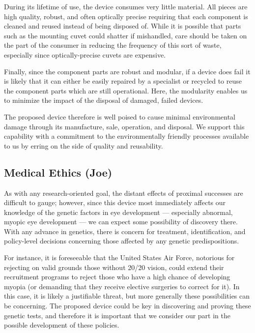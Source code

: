 \documentclass{article}
\begin{document}
During its lifetime of use, the device consumes very little
material. All pieces are high quality, robust, and often optically
precise requiring that each component is cleaned and reused instead of
being disposed of. While it is possible that parts such as the
mounting cuvet could shatter if mishandled, care should be taken on
the part of the consumer in reducing the frequency of this sort of
waste, especially since optically-precise cuvets are expensive.

Finally, since the component parts are robust and modular, if a device
does fail it is likely that it can either be easily repaired by a
specialist or recycled to reuse the component parts which are still
operational. Here, the modularity enables us to minimize the impact of
the disposal of damaged, failed devices.

The proposed device therefore is well poised to cause minimal
environmental damage through its manufacture, sale, operation, and
disposal. We support this capability with a commitment to the
environmentally friendly processes available to us by erring on the
side of quality and reusability.


\subsection{Medical Ethics (Joe)}
\label{sec:blah-blah-blah}

As with any research-oriented goal, the distant effects of proximal
successes are difficult to gauge; however, since this device most
immediately affects our knowledge of the genetic factors in eye
development --- especially abnormal, myopic eye development --- we can
expect some possibility of discovery there. With any advance in
genetics, there is concern for treatment, identification, and
policy-level decisions concerning those affected by any genetic
predispositions.

For instance, it is foreseeable that the United States Air Force, notorious for
rejecting on valid grounds those without 20/20 vision, could extend
their recruitment programs to reject those who have a high chance of
developing myopia (or demanding that they receive elective surgeries
to correct for it). In this case, it is likely a justifiable threat,
but more generally these possibilities can be concerning. The proposed
device could be key in discovering and proving these genetic tests,
and therefore it is important that we consider our part in the
possible development of these policies.
\end{document}
